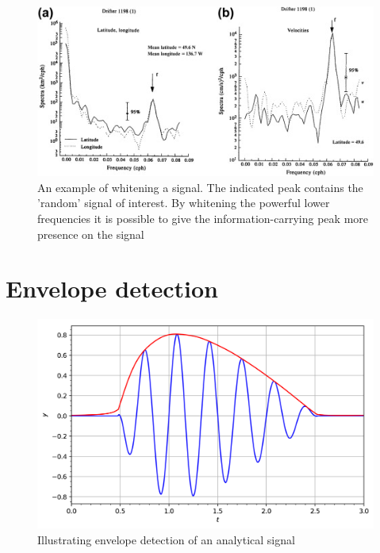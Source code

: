 \begin{figure}[h!t]
	\begin{center}
		\includegraphics[width=1.0\columnwidth]{images/prewhitening_example.jpg}
	\end{center}
	\caption{An example of whitening a signal. The indicated peak contains the 'random' signal of interest. By whitening the powerful lower frequencies it is possible to give the information-carrying peak more presence on the signal \cite{time_series_analysis_methods}}
	\label{fig:whitening_example}
\end{figure}


\section{Envelope detection}

\begin{figure}[h!t]
	\begin{center}
		\includegraphics[width=0.7\columnwidth]{images/envelope_wikipedia.png}
	\end{center}
	\caption{Illustrating envelope detection of an analytical signal \cite{envelope_wikipedia}}
	\label{fig:envelope_wikipedia}
\end{figure}


